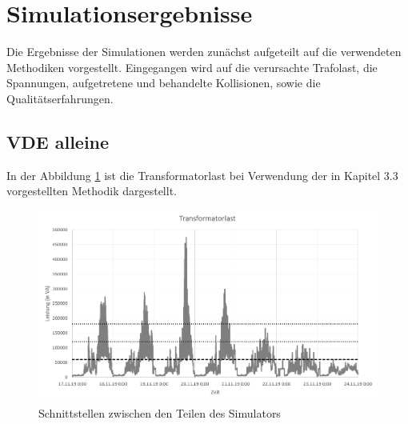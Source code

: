 \section{Simulationsergebnisse}
Die Ergebnisse der Simulationen werden zunächst aufgeteilt auf die verwendeten Methodiken vorgestellt. Eingegangen wird auf die verursachte Trafolast, die Spannungen, aufgetretene und behandelte Kollisionen, sowie die Qualitätserfahrungen.
\subsection{VDE alleine}
In der Abbildung \ref{Abb_VDEtauTrafoLast} ist die Transformatorlast bei Verwendung der in Kapitel 3.3 vorgestellten Methodik dargestellt.\\
\begin{figure}[htb]
\centering
	\includegraphics[scale=0.6]{img/VDE_tau/TrafoLast.png}
	\caption{Schnittstellen zwischen den Teilen des Simulators}
	\label{Abb_VDEtauTrafoLast}
\end{figure}

